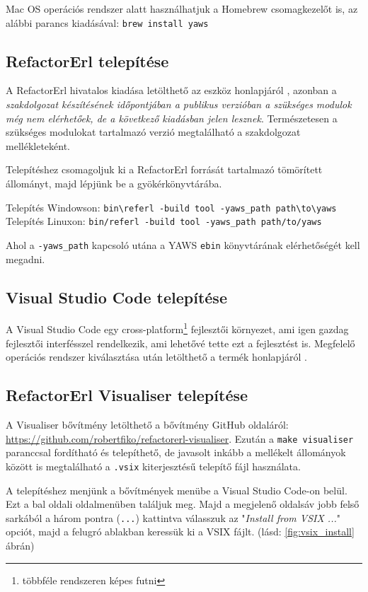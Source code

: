 Mac OS operációs rendszer alatt használhatjuk a Homebrew csomagkezelőt \cite{homebrew} is, az alábbi parancs kiadásával:
\noindent \lstinline{brew install yaws}

\subsection{RefactorErl telepítése}
A RefactorErl hivatalos kiadása letölthető az eszköz honlapjáról \cite{refactorErlWebsite}, azonban a \textit{szakdolgozat készítésének időpontjában a publikus verzióban a szükséges modulok még nem elérhetőek, de a következő kiadásban jelen lesznek}. Természetesen a szükséges modulokat tartalmazó verzió megtalálható a szakdolgozat mellékleteként.

Telepítéshez csomagoljuk ki a RefactorErl forrását tartalmazó tömörített állományt, majd lépjünk be a gyökérkönyvtárába.

\noindent Telepítés Windowson: \lstinline{bin\referl -build tool -yaws_path path\to\yaws}
\noindent Telepítés Linuxon: \lstinline{bin/referl -build tool -yaws_path path/to/yaws}

Ahol a \lstinline{-yaws_path} kapcsoló utána a YAWS \lstinline{ebin} könyvtárának elérhetőségét kell megadni. 

\subsection{Visual Studio Code telepítése}
A Visual Studio Code egy cross-platform\footnote{többféle rendszeren képes futni} fejlesztői környezet, ami igen gazdag fejlesztői interfésszel rendelkezik, ami lehetővé tette ezt a fejlesztést is. Megfelelő operációs rendszer kiválasztása után letölthető a termék honlapjáról \cite{vscodeWebsite}.

\subsection{RefactorErl Visualiser telepítése}
A Visualiser bővítmény letölthető a bővítmény GitHub oldaláról: \url{https://github.com/robertfiko/refactorerl-visualiser}. Ezután a \lstinline{make visualiser} paranccsal fordítható és telepíthető, de javasolt inkább a mellékelt állományok között is megtalálható a \lstinline{.vsix} kiterjesztésű telepítő fájl használata. 

A telepítéshez menjünk a bővítmények menübe a Visual Studio Code-on belül. Ezt a bal oldali oldalmenüben találjuk meg. Majd a megjelenő oldalsáv jobb felső sarkából a három pontra (\lstinline{...}) kattintva válasszuk az "\textit{Install from VSIX ...}" opciót, majd a felugró ablakban keressük ki a VSIX fájlt. (lásd: \ref{fig:vsix_install} ábrán)

